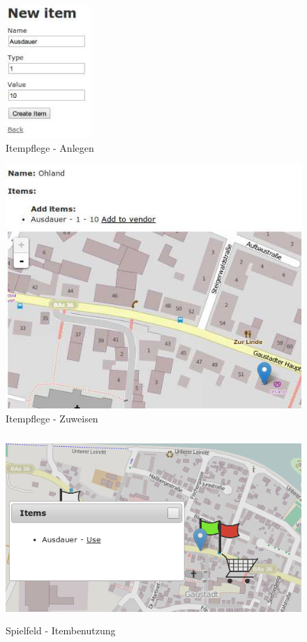 \begin{figure}[H]
\begin{center}
\includegraphics[height=50mm]{images/ch8_item1.png}
\caption{Itempflege - Anlegen}
\label{img:ch8_item1}
\end{center}
\end{figure}

\begin{figure}[H]
\begin{center}
\includegraphics[width=120mm]{images/ch8_item2.png}
\caption{Itempflege - Zuweisen}
\label{img:ch8_item2}
\end{center}
\end{figure}

\begin{figure}[H]
\begin{center}
\includegraphics[height=70mm]{images/ch8_item3.png}
\caption{Spielfeld - Itembenutzung}
\label{img:ch8_item3}
\end{center}
\end{figure}

